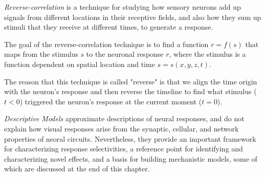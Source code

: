 

\begin{ntn}
  \label{ntn:reverse-correlation}
  \emph{Reverse-correlation} is a technique for studying
  how sensory neurons add up signals from different locations
  in their receptive fields, and also how they sum up stimuli
  that they receive at different times, to generate a response.
\end{ntn}

\begin{rem}
  The goal of the reverse-correlation technique is to find a function $r = f(s)$ that maps from the stimulus $s$ to the neuronal response $r$, where the stimulus is a function dependent on spatial location and time $s = s(x,y,z,t)$. 
\end{rem}

\begin{rem}
  The reason that this technique is called "reverse" is that we align the time origin with the neuron's response and then reverse the timeline to find what stimulus ($t<0$) triggered the neuron's response at the current moment ($t=0$).
\end{rem}

\begin{ntn}%
  \label{ntn: typesOfModels}
  \emph{Descriptive Models} approximate descriptions of neural responses,
  and do not explain how visual responses arise from the synaptic,
  cellular, and network properties of neoral circuits.
  Nevertheless, they provide an important framework for characterizing response selectivities,
  a reference point for identifying and characterizing novel effects,
  and a basis for building mechanistic models,
  some of which are discussed at the end of this chapter.
\end{ntn}

